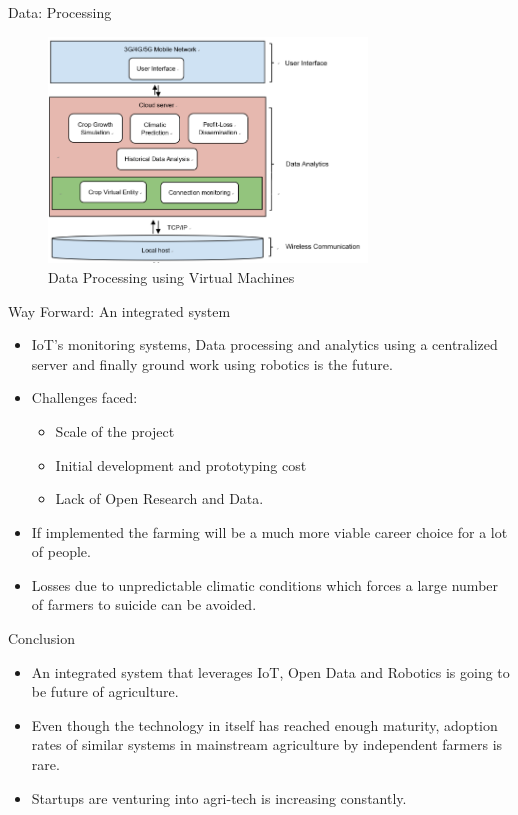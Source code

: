 \documentclass[presentation]{beamer}
\begin{document}
\begin{frame}[label={sec:org178d062}]{Data: Processing}
\begin{figure}[htbp]
\centering
\includegraphics[height=60mm]{./images/datapro.png}
\caption{Data Processing using Virtual Machines}
\end{figure}
\end{frame}
\begin{frame}[label={sec:org3768414}]{Way Forward: An integrated system}
\begin{itemize}
\item IoT's monitoring systems, Data processing and analytics using a centralized server and finally ground work using robotics is the future.
\item Challenges faced:
\begin{itemize}
\item Scale of the project
\item Initial development and prototyping cost
\item Lack of Open Research and Data.
\end{itemize}
\item If implemented the farming will be a much more viable career
choice for a lot of people.
\item Losses due to unpredictable climatic conditions which forces a
large number of farmers to suicide can be avoided.
\end{itemize}
\end{frame}
\begin{frame}[label={sec:orgd3f561c}]{Conclusion}
\begin{itemize}
\item An integrated system that leverages IoT, Open Data and Robotics is
going to be future of agriculture.
\item Even though the technology in itself has reached enough maturity,
adoption rates of similar systems in mainstream agriculture by independent
farmers is rare.
\item Startups are venturing into agri-tech is increasing constantly.
\end{itemize}
\end{frame}
\end{document}
